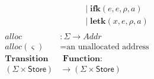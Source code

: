 \documentclass[12pt,draft]{article}
\begin{document}
\begin{align*}
					   &	\;\;\;\;\;\;\;\;\;\; \;|\; \textbf{ifk}(e, e, \rho, a) \\
					   &	\;\;\;\;\;\;\;\;\;\; \;|\; \textbf{letk}(x, e, \rho, a) \\
\\
alloc &: \Sigma \rightarrow Addr \\
alloc(\varsigma) &= \text{an unallocated address} \\
\textbf{Transition}&\textbf{ Function:} \\
(\Sigma \times \textsf{Store}) &\rightarrow (\Sigma \times \textsf{Store}) \\
\end{align*}


\newpage

\end{document}
